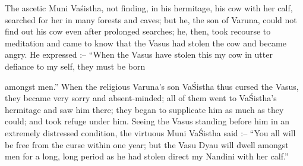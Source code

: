 The ascetic Muni Va\'sistha, not finding, in his hermitage, his cow with her calf, searched for her in many forests and caves; but he, the son of Varuna, could not find out his cow even after prolonged searches; he, then, took recourse to meditation and came to know that the Vasus had stolen the cow and became angry. He expressed :-- ``When the Vasus have stolen this my cow in utter defiance to my self, they must be born

amongst men.'' When the religious Varuna's son Va\'Sistha thus cursed the Vasus, they became very sorry and absent-minded; all of them went to Va\'Sistha's hermitage and saw him there; they began to supplicate him as much as they could; and took refuge under him. Seeing the Vasus standing before him in an extremely distressed condition, the virtuous Muni Va\'Sistha said :-- ``You all will be free from the curse within one year; but the Vasu Dyau will dwell amongst men for a long, long period as he had stolen direct my Nandini with her calf.''

